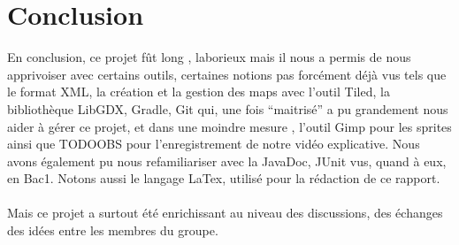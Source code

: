 \documentclass[a4paper,10pt]{article}
\begin{document}
\section{Conclusion}
En conclusion, ce projet fût long , laborieux mais il nous a permis de nous apprivoiser avec certains outils, certaines notions
pas forcément déjà vus tels que le format XML, la création et la gestion des maps avec l'outil Tiled, la bibliothèque LibGDX, Gradle, 
Git qui, une fois ``maitrisé'' a pu grandement nous aider à gérer ce projet, et dans une moindre
mesure , l'outil Gimp pour les sprites ainsi que TODOOBS pour l'enregistrement de notre vidéo explicative. 
Nous avons également pu nous refamiliariser avec la JavaDoc, JUnit vus, quand à eux, en Bac1. Notons aussi le langage LaTex, utilisé pour 
la rédaction de ce rapport.
\\
\\
Mais ce projet a surtout été enrichissant au niveau des discussions, des échanges des idées entre les membres du groupe. 
\end{document}
